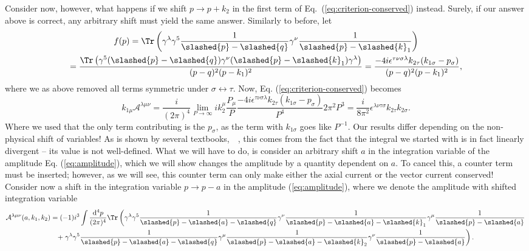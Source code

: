 Consider now, however, what happens if we shift $p\to p+k_2$ in the first term of Eq.~(\ref{eq:criterion-conserved}) instead.
Surely, if our answer above is correct, any arbitrary shift must yield the same answer.
Similarly to before, let
\begin{multline}
  f(p) = \Tr\left(\gamma^{\lambda }\gamma^5 \frac{1}{\slashed{p} - \slashed{q}} \gamma^{\nu } \frac{1}{\slashed{p} - \slashed{k}_{1}} \right)\\
  = \frac{\Tr \left( \gamma ^5 (\slashed{p}-\slashed{q}) \gamma ^{\nu } (\slashed{p}-\slashed{k}_1)\gamma ^{\lambda } \right)}{
   (p-q)^2(p-k_1)^2
  }
  =
  \frac{-4i\epsilon ^{\tau \nu \sigma \lambda } k_{2\tau } (k_{1\sigma } - p_{\sigma })}{
   (p-q)^2(p-k_1)^2
  },
\end{multline}
where we as above removed all terms symmetric under $\sigma \leftrightarrow \tau$.
Now, Eq. (\ref{eq:criterion-conserved}) becomes
\begin{equation}
  k_{1\mu } \mathcal{A}^{\lambda \mu \nu } =
  \frac{i}{(2\pi)^4} \lim_{P \to \infty } ik_2^{\mu } \frac{P_{\mu }}{P}
  \frac{{-4i\epsilon ^{\tau \nu \sigma \lambda } k_{2\tau } (k_{1\sigma }-p_{\sigma })}}{P^{4}}
  2\pi^2P^3
  = \frac{i}{8\pi^2} \epsilon ^{\lambda \nu \tau \sigma } k_{2\tau }k_{2\sigma }.
\end{equation}
Where we used that the only term contributing is the $p_{\sigma }$, as the term with $k_{1\sigma }$ goes like $P^{-1}$.
Our results differ depending on the non-physical shift of variables!
As is shown by several textbooks,~\cite{zeeQuantumFieldTheory2010}~\cite{kachelriessQuantumFieldsHubble2018}, this comes from the fact that the integral we started with is in fact linearly divergent -- its value is not well-defined.
What we will have to do, is consider an arbitrary shift $a$ in the integration variable of the amplitude Eq. (\ref{eq:amplitude}), which we will show changes the amplitude by a quantity dependent on $a$.
To cancel this, a counter term must be inserted;
however, as we will see, this counter term can only make either the axial current or the vector current conserved!
Consider now a shift in the integration variable $p \to p - a$ in the amplitude (\ref{eq:amplitude}), where we denote the amplitude with shifted integration variable
\begin{multline}
  \label{eq:amplitude-shift}
  \mathcal{A}^{\lambda \mu \nu}(a, k_1, k_2) =
  (-1) i^3 \int \frac{\mathrm{d}^4p}{(2\pi)^{4}}
  \Tr \left(
    \gamma ^{\lambda } \gamma ^5 \frac{1}{\slashed{p} - \slashed{a} - \slashed{q}} \gamma ^{\nu } \frac{1}{\slashed{p} - \slashed{a}- \slashed{k}_{1}} \gamma ^{\mu } \frac{1}{\slashed{p} - \slashed{a}} \right.\\
    +
   \left. \gamma ^{\lambda }\gamma ^5 \frac{1}{\slashed{p} - \slashed{a}- \slashed{q}} \gamma ^{\mu } \frac{1}{\slashed{p} - \slashed{a} - \slashed{k}_2} \gamma ^{\nu } \frac{1}{\slashed{p} - \slashed{a}}
  \right).
\end{multline}

